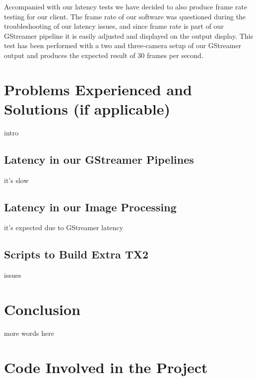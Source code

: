 \documentclass[letterpaper,10pt,serif,draftclsnofoot,onecolumn,compsoc,titlepage]{IEEEtran}
\begin{document}
Accompanied with our latency tests we have decided to also produce frame rate testing for 
our client. The frame rate of our software was questioned during the troubleshooting of 
our latency issues, and since frame rate is part of our GStreamer pipeline it is easily 
adjusted and displayed on the output display. This test has been performed with a two and 
three-camera setup of our GStreamer output and produces the expected result of 30 frames 
per second.  \\

\section{Problems Experienced and Solutions (if applicable)}

intro\\

\subsection{Latency in our GStreamer Pipelines}

it's slow \\

\subsection{Latency in our Image Processing}

it's expected due to GStreamer latency \\

\subsection{Scripts to Build Extra TX2}

issues \\

\section{Conclusion}

more words here\\

\section{Code Involved in the Project}
\end{document}

